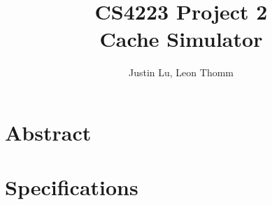 \documentclass{article}
\begin{document}

\title{CS4223 Project 2\\Cache Simulator}
\author{Justin Lu, Leon Thomm}
\maketitle

\renewcommand\thesection{\arabic{section}}
\renewcommand\thesubsection{\thesection.\alph{subsection}}

\section{Abstract}

\section{Specifications}
\end{document}
